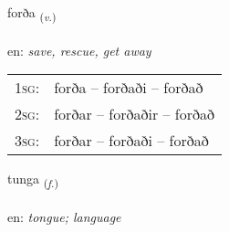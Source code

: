 \documentclass[frontgrid, backgrid]{flacards}\usepackage[]{graphicx}\usepackage[]{color}
\begin{document}
{forða \small{\textsubscript{(\textit{v.})}} \\[1ex] %
\textphonetic{[fɔrða]} \\
en: \emph{save, rescue, get away} \\  [2ex]
\renewcommand*{\arraystretch}{0.8}
\begin{tabular}{p{1cm}l}
\textsc{1sg}: & forða -- forðaði -- forðað \\ 
\textsc{2sg}: & forðar -- forðaðir -- forðað \\ 
\textsc{3sg}: & forðar -- forðaði -- forðað \\ 
\end{tabular}
}

\renewcommand{\flhead}{\vskip5pt \fboxsep=0pt {\small\bfseries\footnotesize Nafnorð | Noun}}
\renewcommand{\fcfoot}{\vskip5pt \fboxsep=0pt \hspace{2pt}{\small\bfseries\footnotesize 2K}}

\renewcommand{\blhead}{\vskip5pt {\small\bfseries\footnotesize Nafnorð | Noun }}
\renewcommand{\bcfoot}{\vskip5pt \hspace{2pt}{\small\bfseries\footnotesize 2K}}


{tunga \small{\textsubscript{(\textit{f.})}} \\[1ex] %
\textphonetic{[tʰuŋka]} \\
en: \emph{tongue; language} \\  [2ex]
\renewcommand*{\arraystretch}{0.8}
}

\renewcommand{\flhead}{\vskip5pt \fboxsep=0pt {\small\bfseries\footnotesize Nafnorð | Noun}}
\renewcommand{\fcfoot}{\vskip5pt \fboxsep=0pt \hspace{2pt}{\small\bfseries\footnotesize 2K}}
\end{document}
